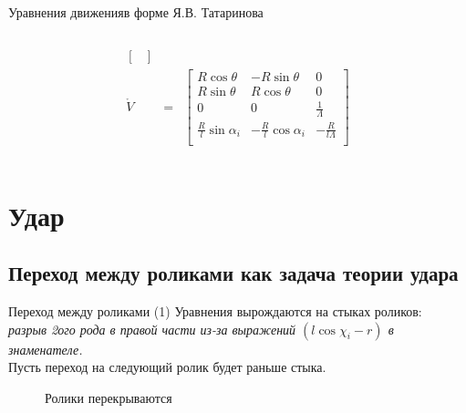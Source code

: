 \documentclass{beamer}
\begin{document}
\begin{frame}{Уравнения движения}{в форме Я.В. Татаринова}
\begin{columns}
\begin{column}{0.6\textwidth}
\begin{eqnarray*}
\begin{bmatrix}
                    \end{bmatrix} \\
                \mathring{V} & = &
                    \begin{bmatrix}
                        R\cos\theta & -R\sin\theta & 0 \\
                        R\sin\theta & R\cos\theta  & 0 \\
                        0           & 0            & \frac{1}{\Lambda} \\
                        \frac{R}{l}\sin\alpha_i & -\frac{R}{l}\cos\alpha_i & -\frac{R}{l\Lambda} \\
                    \end{bmatrix}
            \end{eqnarray*}
        \end{column}
    \end{columns}
\end{frame}

\section{Удар}

\subsection{Переход между роликами как задача теории удара}

\begin{frame}{Переход между роликами}
    \textcolor{Periwinkle}{(1) Уравнения вырождаются на стыках роликов:}\\
    \textit{разрыв 2ого рода в правой части из-за выражений $(l\cos\chi_i-r)$ в знаменателе.} \\
    Пусть переход на следующий ролик будет раньше стыка.
    \begin{figure}
        \centering
        \caption{Ролики перекрываются}
    \end{figure}
\end{frame}
\end{document}
